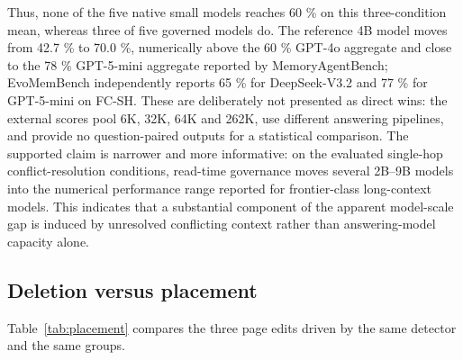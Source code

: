 \documentclass[journal=jcisd8,manuscript=article]{achemso}
\begin{document}
Thus, none of the five native small models reaches 60 \% on this three-condition mean, whereas three of five governed models do. The reference 4B model moves from 42.7 \% to 70.0 \%, numerically above the 60 \% GPT-4o aggregate and close to the 78 \% GPT-5-mini aggregate reported by MemoryAgentBench; EvoMemBench independently reports 65 \% for DeepSeek-V3.2 and 77 \% for GPT-5-mini on FC-SH. These are deliberately not presented as direct wins: the external scores pool 6K, 32K, 64K and 262K, use different answering pipelines, and provide no question-paired outputs for a statistical comparison. The supported claim is narrower and more informative: on the evaluated single-hop conflict-resolution conditions, read-time governance moves several 2B--9B models into the numerical performance range reported for frontier-class long-context models. This indicates that a substantial component of the apparent model-scale gap is induced by unresolved conflicting context rather than answering-model capacity alone.

\subsection{Deletion versus placement}
\label{sec:placement}

Table~\ref{tab:placement} compares the three page edits driven by the same detector and the same groups.
\end{document}
